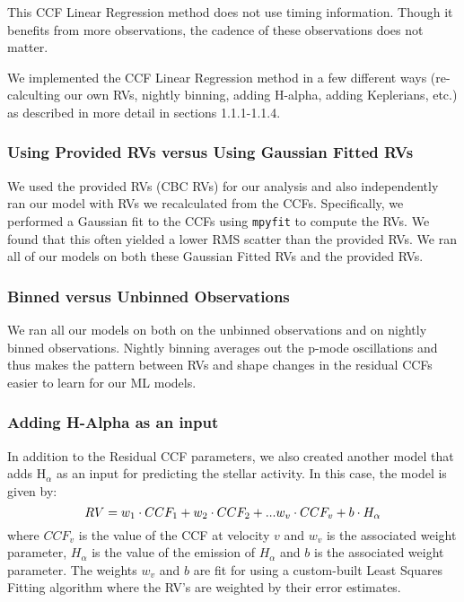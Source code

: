 \documentclass[12pt]{article}
\begin{document}
This CCF Linear Regression method does not use timing information.  Though it benefits from more observations, the cadence of these observations does not matter. 

We implemented the CCF Linear Regression method in a few different ways (re-calculting our own RVs, nightly binning, adding H-alpha, adding Keplerians, etc.) as described in more detail in sections 1.1.1-1.1.4.

\subsubsection{Using Provided RVs versus Using Gaussian Fitted RVs}

We used the provided RVs (CBC RVs) for our analysis and also independently ran our model with RVs we recalculated from the CCFs. Specifically, we performed a Gaussian fit to the CCFs using \texttt{mpyfit} to compute the RVs. We found that this often yielded a lower RMS scatter than the provided RVs. We ran all of our models on both these Gaussian Fitted RVs and the provided RVs.


\subsubsection{Binned versus Unbinned Observations}
We ran all our models on both on the unbinned observations and on nightly binned observations. Nightly binning averages out the p-mode oscillations and thus makes the pattern between RVs and shape changes in the residual CCFs easier to learn for our ML models.


\subsubsection{Adding H-Alpha as an input}
In addition to the Residual CCF parameters, we also created another model that adds H$_\alpha$ as an input for predicting the stellar activity. In this case, the model is given by:
\begin{equation}
RV = w_1\cdot CCF_1 +  w_2\cdot CCF_2 + ...  w_v\cdot CCF_v  + b\cdot H_{\alpha} \\
\end{equation}
where $CCF_v$ is the value of the CCF at velocity $v$ and $w_v$ is the associated weight parameter, $H_{\alpha}$ is the value of the emission of $H_{\alpha}$ and $b$ is the associated weight parameter. The weights $w_v$ and $b$ are fit for using a custom-built Least Squares Fitting algorithm where the RV's are weighted by their error estimates.
\end{document}
